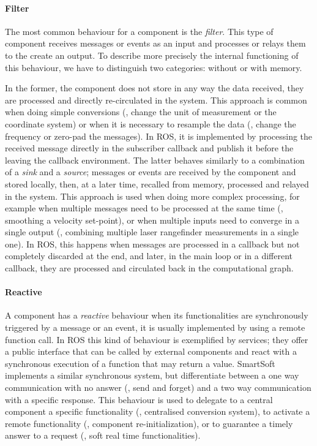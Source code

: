 \paragraph{Filter} The most common behaviour for a component is the \textit{filter}. This type of component receives messages or events as an input and processes or relays them to the create an output. To describe more precisely the internal functioning of this behaviour, we have to distinguish two categories: without or with memory. 

In the former, the component does not store in any way the data received, they are processed and directly re-circulated in the system. This approach is common when doing simple conversions (\eg, change the unit of measurement or the coordinate system) or when it is necessary to resample the data (\eg, change the frequency or zero-pad the messages). In ROS, it is implemented by processing the received message directly in the subscriber callback and publish it before the leaving the callback environment. The latter behaves similarly to a combination of a \textit{sink} and a \textit{source}; messages or events are received by the component and stored locally, then, at a later time, recalled from memory, processed and relayed in the system. This approach is used when doing more complex processing, for example when multiple messages need to be processed at the same time (\eg, smoothing a velocity set-point), or when multiple inputs need to converge in a single output (\eg, combining multiple laser rangefinder measurements in a single one). In ROS, this happens when messages are processed in a callback but not completely discarded at the end, and later, in the main loop or in a different callback, they are processed and circulated back in the computational graph.

\paragraph{Reactive} A component has a \textit{reactive} behaviour when its functionalities are synchronously triggered by a message or an event, it is usually implemented by using a remote function call. In ROS this kind of behaviour is exemplified by services; they offer a public interface that can be called by external components and react with a synchronous execution of a function that may return a value.  SmartSoft implements a similar synchronous system, but differentiate between a one way communication with no answer (\ie, send and forget) and a two way communication with a specific response. This behaviour is used to delegate to a central component a specific functionality (\eg, centralised conversion system), to activate a remote functionality (\eg, component \mbox{re-initialization}), or to guarantee a timely answer to a request (\eg, soft real time functionalities).

